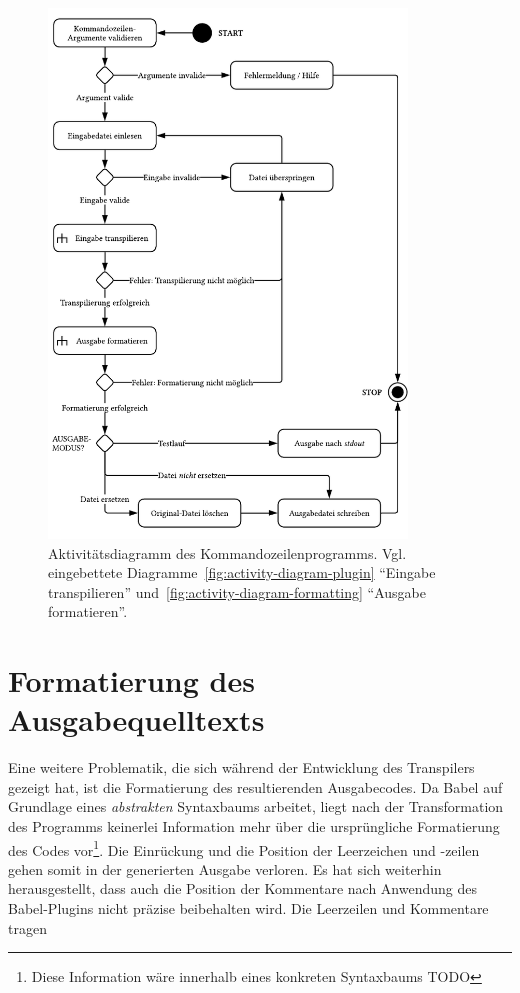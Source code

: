 \begin{figure}[tbp]
  \centering
  \includegraphics[width=0.85\textwidth]{src/4_Umsetzung/fig/activity-diagram-cli.pdf}
	\caption[Aktivitätsdiagramm des Kommandozeilenprogramms]{Aktivitätsdiagramm des Kommandozeilenprogramms. Vgl. eingebettete Diagramme~\ref{fig:activity-diagram-plugin} \enquote{Eingabe transpilieren} und~\ref{fig:activity-diagram-formatting} \enquote{Ausgabe formatieren}.}
	\label{fig:activity-diagram-cli}
\end{figure}

\section{Formatierung des Ausgabequelltexts}

Eine weitere Problematik, die sich während der Entwicklung des Transpilers gezeigt hat, ist die Formatierung des resultierenden Ausgabecodes. Da Babel auf Grundlage eines \emph{abstrakten} Syntaxbaums arbeitet, liegt nach der Transformation des Programms keinerlei Information mehr über die ursprüngliche Formatierung des Codes vor\footnote{Diese Information wäre innerhalb eines konkreten Syntaxbaums TODO}. Die Einrückung und die Position der Leerzeichen und -zeilen gehen somit in der generierten Ausgabe verloren. Es hat sich weiterhin herausgestellt, dass auch die Position der Kommentare nach Anwendung des Babel-Plugins nicht präzise beibehalten wird. Die Leerzeilen und Kommentare tragen

